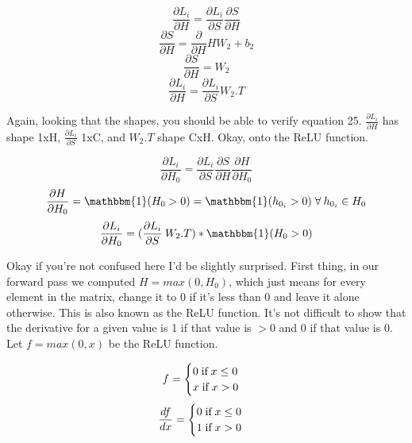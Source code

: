 \documentclass[12pt]{article}
\begin{document}
\begin{equation}
    \frac{\partial L_i}{\partial H} = \frac{\partial L_i}{\partial S} \frac{\partial S}{\partial H}
\end{equation}
\begin{equation}
    \frac{\partial S}{\partial H} = \frac{\partial }{\partial H} HW_2 + b_2
\end{equation}
\begin{equation}
    \frac{\partial S}{\partial H} = W_2
\end{equation}
\begin{equation}
    \frac{\partial L_i}{\partial H} = \frac{\partial L_i}{\partial S} W_2.T
\end{equation}

Again, looking that the shapes, you should be able to verify equation 25. $\frac{\partial L_i}{\partial H}$
has shape 1xH, $\frac{\partial L_i}{\partial S}$ 1xC, and $W_2.T$ shape CxH. Okay, onto the ReLU function. 

\begin{equation}
    \frac{\partial L_i}{\partial H_0} = \frac{\partial L_i}{\partial S} \frac{\partial S}{\partial H}
    \frac{\partial H}{\partial H_0}
\end{equation}
\begin{equation}
    \frac{\partial H}{\partial H_0} = \mathbbm{1}(H_0 > 0) = \mathbbm{1}(h_{0_i} > 0) \; \forall \: h_{0_i} \in H_0
\end{equation}
\begin{equation}
    \frac{\partial L_i}{\partial H_0} = (\frac{\partial L_i}{\partial S}\: W_2.T) * \mathbbm{1}(H_0 > 0)
\end{equation}

Okay if you're not confused here I'd be slightly surprised. First thing, in our forward pass we computed 
$H = max(0, H_0)$, which just means for every element in the matrix, change it to 0 if it's less than 0 
and leave it alone otherwise. This is also known as the ReLU function. It's not difficult to show that 
the derivative for a given value is 1 if that value is $> 0$ and 0 if that value is 0. Let $f = max(0, x)$
be the ReLU function. 

\begin{equation}
    f = 
    \begin{cases}
        0 \; $if$ \; x \le 0\\
        x \; $if$ \; x > 0
    \end{cases} 
\end{equation}
\begin{equation}
    \frac{df}{dx} = 
    \begin{cases}
        0 \; $if$ \; x \le 0\\
        1 \; $if$ \; x > 0
    \end{cases} 
\end{equation}
\end{document}
